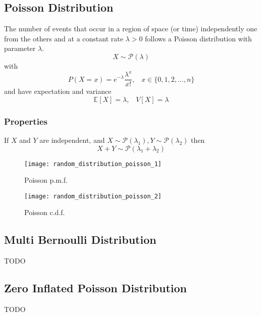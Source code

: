 \subsection{Poisson Distribution}
The number of events that occur in a region of space (or time) independently one from the others and at a constant rate $\lambda >0$ 
follows a Poisson distribution with parameter $\lambda$.
\[ X \sim \mathcal{P}(\lambda)\]
with
\[ P(X=x) = e^{-\lambda}\frac{\lambda^x}{x!},\;\;\; x \in \{0,1,2,\dots,n\} \]
and have expectation and variance
\[ \mathbb{E}[X] = \lambda,\;\;\; V[X] = \lambda \]

\subsubsection{Properties}
If $X$ and $Y$ are independent, and $X \sim \mathcal{P}(\lambda_1), Y \sim \mathcal{P}(\lambda_2)$ then 
\[ X+Y \sim \mathcal{P}(\lambda_1+\lambda_2) \]

\begin{figure}[!ht]
    \begin{minipage}{0.45\linewidth}
      \texttt{[image: random\_distribution\_poisson\_1]}
      \caption{Poisson p.m.f.}
    \end{minipage}
    \hfill
    \begin{minipage}{0.45\linewidth}
      \texttt{[image: random\_distribution\_poisson\_2]}
      \caption{Poisson c.d.f.}
    \end{minipage}
\end{figure}

\subsection{Multi Bernoulli Distribution}
TODO


\subsection{Zero Inflated Poisson Distribution}
TODO
